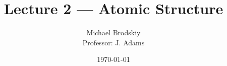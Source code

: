 


\title{Lecture 2 — Atomic Structure}
\date{\today}
\author{Michael Brodskiy\\ \small Professor: J. Adams}



\maketitle

